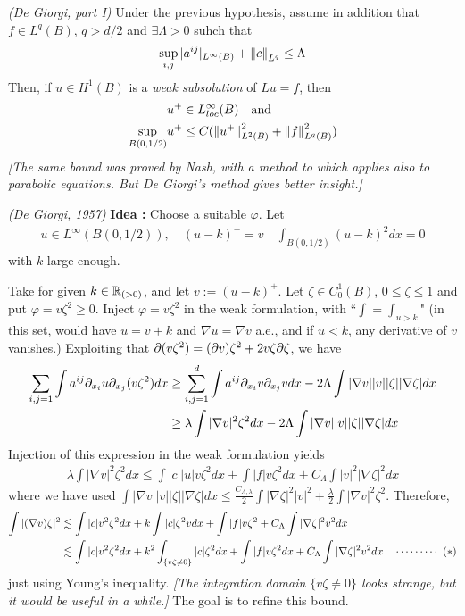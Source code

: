 \documentclass[12pt,a4paper]{article}
\newenvironment{proof}
{\begin{changemargin}{0.5cm}{0.5cm} 
	}%
	{\end{changemargin}
}
\newenvironment{p}
{\begin{proof} 
	}%
	{\end{proof}
}
\begin{document}
\thm \emph{(De Giorgi, part I)} Under the previous hypothesis, assume in addition that $f\in L^q(B)$, $q> d/2$ and $\exists \Lambda >0$ suhch that
\begin{align*}
\sup_{i,j} |a^{ij}|_{L^{\infty}(B)} + \snorms{c}{L^q} \leq \Lambda
\end{align*}
Then, if $u \in H^1(B)$ is a \emph{weak subsolution} of $Lu =f$, then
\begin{align*}
& u^+ \in L^{\infty}_{loc}(B) \quad \text{and}\\
\sup_{B(0, 1/2)} & u^+ \leq C(\snorms{u^+}{L^2(B)}^2 + \snorms{f}{L^q(B)}^2)
\end{align*}
\emph{[The same bound was proved by Nash, with a method to which applies also to parabolic equations. But De Giorgi's method gives better insight.]} 
\begin{p}
\pf \emph{(De Giorgi, 1957)} \textbf{Idea :} Choose a suitable $\varphi$. Let
\begin{align*}
u\in L^{\infty}(B(0,1/2)), \quad (u-k)^+ = v \quad \int_{B(0, 1/2)}(u-k)^2 dx = 0
\end{align*}
with $k$ large enough.
\s

Take for given $k \in \mathbb{R}_{(>0)}$, and let $v:= (u-k)^+$. Let $\zeta \in C_0^1(B)$, $0\leq \zeta \leq 1$ and put $\varphi = v\zeta^2 \geq 0$. Inject $\varphi = v\zeta^2$ in the weak formulation, with ``$\int = \int_{u>k}$" (in this set, would have $u=v +k$ and $\nabla u = \nabla v$ a.e., and if $u<k$, any derivative of $v$ vanishes.) Exploiting that $\partial (v\zeta^2) = (\partial v) \zeta^2 + 2v\zeta \partial \zeta$, we have
\begin{align*}
\sum_{i,j=1} \int a^{ij} \partial_{x_i} u \partial_{x_j}(v\zeta^2) dx & \geq \sum_{i,j=1}^d \int a^{ij} \partial_{x_i} v \partial_{x_j} v dx - 2\Lambda \int |\nabla v| |v| |\zeta| |\nabla \zeta| dx \\
& \geq \lambda \int |\nabla v|^2 \zeta^2 dx - 2\Lambda \int |\nabla v| |v| |\zeta| |\nabla \zeta| dx
\end{align*} 
Injection of this expression in the weak formulation yields
\begin{align*}
\lambda \int |\nabla v|^2 \zeta^2 dx \leq \int |c||u|v\zeta^2 dx + \int |f| v\zeta^2 dx + C_{\Lambda} \int |v|^2 |\nabla \zeta|^2 dx 
\end{align*}
where we have used $\int |\nabla v||v||\zeta||\nabla \zeta| dx \leq \frac{C_{\Lambda, \lambda}}{2} \int |\nabla \zeta|^2 |v|^2 + \frac{\lambda}{2} \int |\nabla v|^2 \zeta^2$. Therefore,
\begin{align*}
\int |(\nabla v) \zeta|^2 & \lesssim \int |c|v^2 \zeta^2 dx + k \int |c|\zeta^2 v dx + \int |f| v\zeta^2 + C_{\Lambda} \int |\nabla \zeta|^2 v^2 dx  \\
& \lesssim \int |c|v^2 \zeta^2 dx + k^2 \int_{\{v\zeta \neq 0\}} |c|\zeta^2 dx + \int |f| v\zeta^2 dx + C_{\Lambda} \int |\nabla \zeta|^2 v^2 dx \quad \cdots\cdots\cdots\,\,(*)
\end{align*}
just using Young's inequality. \emph{[The integration domain $\{v\zeta \neq 0\}$ looks strange, but it would be useful in a while.]} The goal is to refine this bound. 
\s


\end{p}
\end{document}
